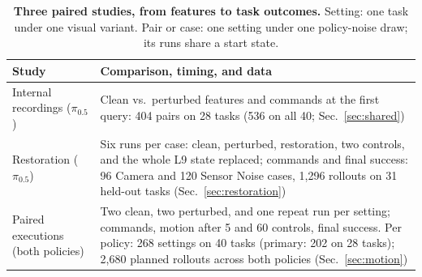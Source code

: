 \begin{table}[ht]
\centering\small
\setlength{\tabcolsep}{3pt}
\begin{tabular}{@{}>{\raggedright\arraybackslash}p{}>{\raggedright\arraybackslash}p{}@{}}
\toprule
Study & Comparison, timing, and data\\\midrule
Internal recordings ($\pi_{0.5}$) & Clean vs.\ perturbed features and commands at the first query: 404 pairs on 28 tasks (536 on all 40; Sec.~\ref{sec:shared})\\\addlinespace[2pt]
Restoration ($\pi_{0.5}$) & Six runs per case: clean, perturbed, restoration, two controls, and the whole L9 state replaced; commands and final success: 96 Camera and 120 Sensor Noise cases, 1,296 rollouts on 31 held-out tasks (Sec.~\ref{sec:restoration})\\\addlinespace[2pt]
Paired executions (both policies) & Two clean, two perturbed, and one repeat run per setting; commands, motion after 5 and 60 controls, final success. Per policy: 268 settings on 40 tasks (primary: 202 on 28 tasks); 2,680 planned rollouts across both policies (Sec.~\ref{sec:motion})\\
\bottomrule
\end{tabular}
\caption{\textbf{Three paired studies, from features to task outcomes.} Setting: one task under one visual variant. Pair or case: one setting under one policy-noise draw; its runs share a start state.}
\label{tab:study-map}
\end{table}
